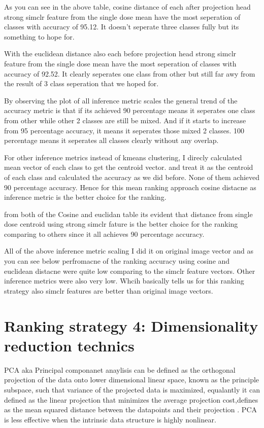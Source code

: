 As you can see in the above table, cosine distance of each after projection head strong simclr feature from the single dose mean have the most seperation of classes with accuracy of 95.12. It doesn't seperate three classes fully but its something to hope for. 

With the euclidean distance also  each before projection head strong simclr feature from the single dose mean have the most seperation of classes with accuracy of 92.52. It clearly  seperates one class from other but still far awy from the result of 3 class seperation that we hoped for.

By observing the plot of all inference metric scales the general trend of the accuracy metric is that if its achieved 90 percentage means it seperates one class from other while other 2 classes are still be mixed. And if it starts to increase  from   95 percentage accuracy, it means it seperates those mixed  2 classes. 100 percentage means it seperates all classes clearly without any overlap.

For other inference metrics instead of kmeans clustering, I direcly calculated mean vector of each class to get the centroid vector. and treat it as the centroid of each class and calculated the accuracy as we did before. None of them achieved 90 percentage accuracy. Hence for this mean ranking approach cosine distacne as inference metric is the better choice for the ranking. 

from both of the Cosine and euclidan table its evident that distance from single dose centroid using strong simclr fature is the better choice for the ranking comparing to others since it all achieves 90 percentage accuracy.

All of the above inference metric scaling  I did it on original image vector and as you can see below perfromacne of the ranking accuracy using cosine and euclidean distacne were quite low comparing to the simclr feature vectors. Other inference metrics were also very low. Whcih basically tells us for this ranking strategy also simclr features are better than original image vectors.



\section{ Ranking strategy 4: Dimensionality reduction technics}



PCA  aka Principal componanet anaylisis can be defined as the orthogonal projection of the data onto lower dimensional linear space, known as the principle subspace, such that variance of the projected data is maximized, equalantly it can defined as the linear projection that minimizes the average projection cost,defines as the mean squared distance between the datapoints and their projection \cite{bishop:2006:PRML}.  PCA is less effective when the intrinsic data structure is highly nonlinear.

